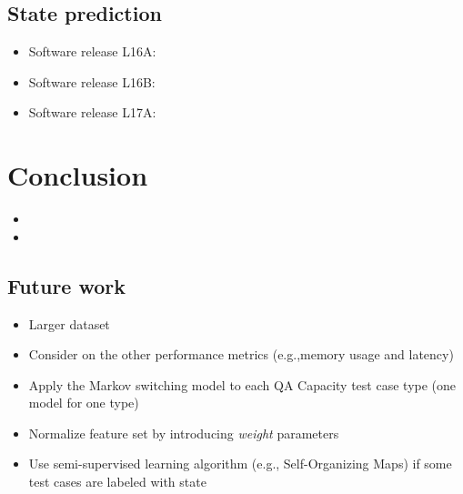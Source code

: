 \documentclass{beamer}
\begin{document}
\subsection{State prediction}
\begin{frame}

	
	\begin{itemize}
		\item Software release L16A:
		
		
		\item Software release L16B:
		
		
		\item Software release L17A:
		

	\end{itemize}
	
\end{frame}

\section{Conclusion}
\begin{frame}
\begin{itemize}
	\item 
	\item 
\end{itemize}
\end{frame}

\subsection{Future work}
\begin{frame}
\begin{itemize}
	\item Larger dataset
	\item Consider on the other performance metrics (e.g.,memory usage and latency) 
	\item Apply the Markov switching model to each QA Capacity test case type (one model for one type)
	\item Normalize feature set by introducing \textit{weight} parameters
	\item Use semi-supervised learning algorithm (e.g., Self-Organizing Maps) if some test cases are labeled with state
\end{itemize}
\end{frame}
\end{document}
